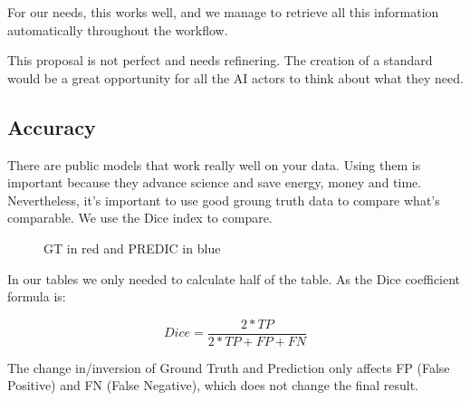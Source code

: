 For our needs, this works well, and we manage to retrieve all this information
automatically throughout the workflow.


This proposal is not perfect and needs refinering. The creation of a standard
would be a great opportunity for all the AI actors to think about what they
need.

\subsection{Accuracy}

There are public models that work really well on your data. Using them is
important because they advance science and save energy, money and time.
Nevertheless, it's important to use good groung truth data to compare what's
comparable. We use the Dice index to compare.

\begin{figure}[H]
\centering
{}
\caption{GT in red and PREDIC in blue} \label{fig:dice}
\end{figure}

In our tables we only needed to calculate half of the table. As the Dice
coefficient formula is:

\[ Dice = \frac{2*TP}{2*TP + FP + FN} \]

The change in/inversion of Ground Truth and Prediction
only affects FP (False Positive) and FN (False Negative), which does not change
the final result.

